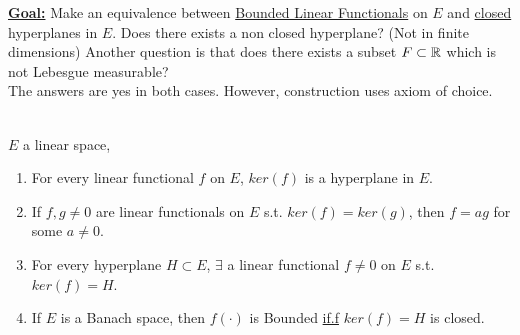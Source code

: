 \np \textbf{\underline{Goal:}} Make an equivalence between \underline{Bounded Linear Functionals} on $E$ and \underline{closed} hyperplanes in $E$. Does there exists a non closed hyperplane? (Not in finite dimensions) Another question is that does there exists a subset $F \subset \mathbb{R}$ which is not Lebesgue
measurable?\\ 
The answers are yes in both cases. However, construction uses axiom of choice.

\begin{proposition}\label{4.4}\ \\
$E$ a linear space,
\begin{enumerate}[label = (\alph*)]
    \item For every linear functional $f$ on $E$, $ker(f)$ is a hyperplane in $E$.
    \item  If $f,g\neq 0$ are linear functionals on $E$ s.t. $ker(f) = ker(g)$, then $f = ag$ for some $a \neq 0$. 
    \item For every hyperplane $H \subset E$, $\exists$ a linear functional $f \neq 0$ on $E$ s.t. $ker(f) = H$.
    \item If $E$ is a Banach space, then $f(\cdot)$ is Bounded \underline{if.f} $ker(f) = H$ is closed.
\end{enumerate}
\end{proposition}
